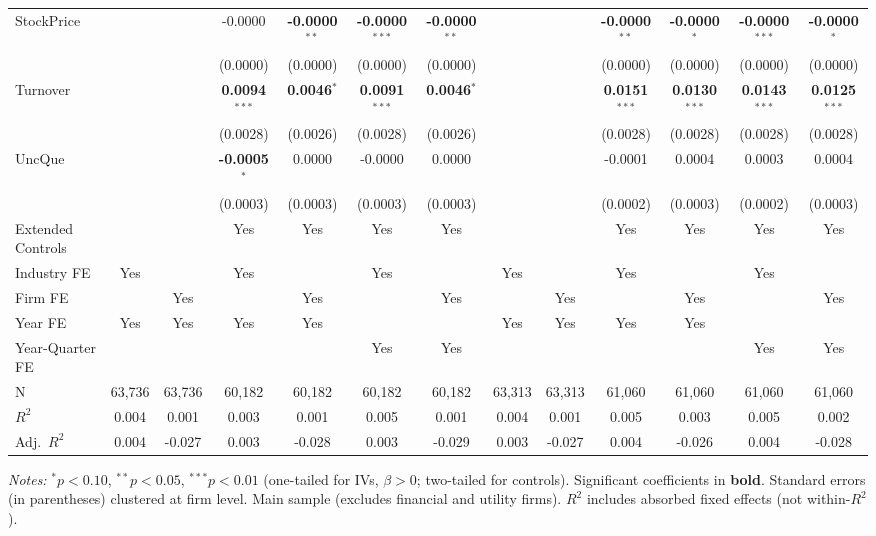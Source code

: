 \documentclass[11pt,a4paper]{article}
\begin{document}
\begin{table}[htbp]
\begin{tabular}{lcccccccccccc}
StockPrice &  &  & -0.0000 & \textbf{-0.0000}$^{**}$ & \textbf{-0.0000}$^{***}$ & \textbf{-0.0000}$^{**}$ &  &  & \textbf{-0.0000}$^{**}$ & \textbf{-0.0000}$^{*}$ & \textbf{-0.0000}$^{***}$ & \textbf{-0.0000}$^{*}$ \\
 &  &  & (0.0000) & (0.0000) & (0.0000) & (0.0000) &  &  & (0.0000) & (0.0000) & (0.0000) & (0.0000) \\
Turnover &  &  & \textbf{0.0094}$^{***}$ & \textbf{0.0046}$^{*}$ & \textbf{0.0091}$^{***}$ & \textbf{0.0046}$^{*}$ &  &  & \textbf{0.0151}$^{***}$ & \textbf{0.0130}$^{***}$ & \textbf{0.0143}$^{***}$ & \textbf{0.0125}$^{***}$ \\
 &  &  & (0.0028) & (0.0026) & (0.0028) & (0.0026) &  &  & (0.0028) & (0.0028) & (0.0028) & (0.0028) \\
UncQue &  &  & \textbf{-0.0005}$^{*}$ & 0.0000 & -0.0000 & 0.0000 &  &  & -0.0001 & 0.0004 & 0.0003 & 0.0004 \\
 &  &  & (0.0003) & (0.0003) & (0.0003) & (0.0003) &  &  & (0.0002) & (0.0003) & (0.0002) & (0.0003) \\
\midrule
Extended Controls &  &  & Yes & Yes & Yes & Yes &  &  & Yes & Yes & Yes & Yes \\
Industry FE & Yes &  & Yes &  & Yes &  & Yes &  & Yes &  & Yes &  \\
Firm FE &  & Yes &  & Yes &  & Yes &  & Yes &  & Yes &  & Yes \\
Year FE & Yes & Yes & Yes & Yes &  &  & Yes & Yes & Yes & Yes &  &  \\
Year-Quarter FE &  &  &  &  & Yes & Yes &  &  &  &  & Yes & Yes \\
\midrule
N & 63,736 & 63,736 & 60,182 & 60,182 & 60,182 & 60,182 & 63,313 & 63,313 & 61,060 & 61,060 & 61,060 & 61,060 \\
$R^2$ & 0.004 & 0.001 & 0.003 & 0.001 & 0.005 & 0.001 & 0.004 & 0.001 & 0.005 & 0.003 & 0.005 & 0.002 \\
Adj.~$R^2$ & 0.004 & -0.027 & 0.003 & -0.028 & 0.003 & -0.029 & 0.003 & -0.027 & 0.004 & -0.026 & 0.004 & -0.028 \\
\bottomrule
\end{tabular}
\begin{minipage}{\linewidth}
\vspace{2pt}\scriptsize
\textit{Notes:} $^{*}p<0.10$, $^{**}p<0.05$, $^{***}p<0.01$ (one-tailed for IVs, $\beta > 0$; two-tailed for controls).
 Significant coefficients in \textbf{bold}.
 Standard errors (in parentheses) clustered at firm level.
 Main sample (excludes financial and utility firms).
 $R^2$ includes absorbed fixed effects (not within-$R^2$).
\end{minipage}
\end{table}
\end{document}
